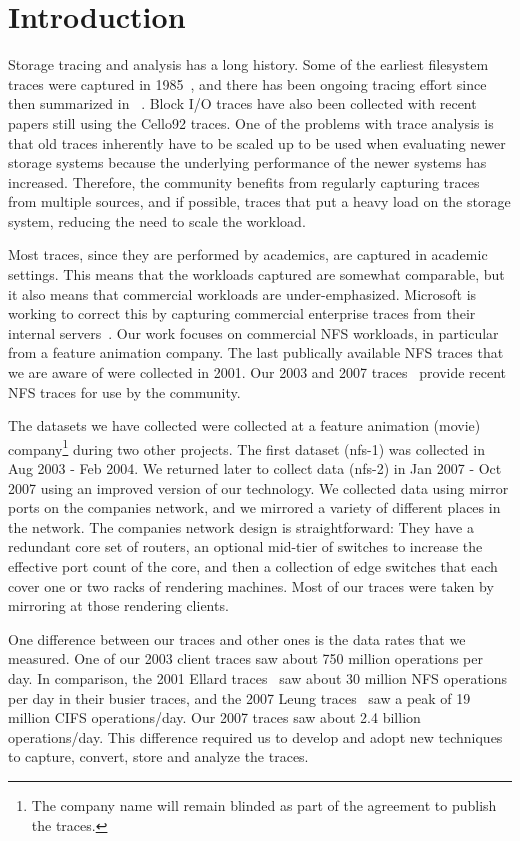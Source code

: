 \section{Introduction}

Storage tracing and analysis has a long history.  Some of the earliest
filesystem traces were captured in 1985~\cite{ousterhout85}, and there
has been ongoing tracing effort since then summarized in
~\cite{LeungUsenix08}.  Block I/O traces have also been collected with
recent papers still using the Cello92 traces.  One of the problems
with trace analysis is that old traces inherently have to be scaled up
to be used when evaluating newer storage systems because the
underlying performance of the newer systems has increased.  Therefore,
the community benefits from regularly capturing traces from multiple
sources, and if possible, traces that put a heavy load on the storage
system, reducing the need to scale the workload.

Most traces, since they are performed by academics, are captured in
academic settings.  This means that the workloads captured are
somewhat comparable, but it also means that commercial workloads are
under-emphasized.  Microsoft is working to correct this by capturing
commercial enterprise traces from their internal
servers~\cite{snia-iotta-microsoft}.  Our work focuses on commercial
NFS workloads, in particular from a feature animation company.  The
last publically available NFS traces that we are aware of were
collected in 2001.  Our 2003 and 2007
traces~\cite{animation-bear-traces} provide recent NFS traces for use
by the community.

The datasets we have collected were collected at a feature animation
(movie) company\footnote{The company name will remain blinded as part
of the agreement to publish the traces.} during two other projects.
The first dataset (nfs-1) was collected in Aug 2003 - Feb 2004.  We
returned later to collect data (nfs-2) in Jan 2007 - Oct 2007 using an
improved version of our technology.  We collected data using mirror
ports on the companies network, and we mirrored a variety of different
places in the network.  The companies network design is
straightforward: They have a redundant core set of routers, an
optional mid-tier of switches to increase the effective port count of
the core, and then a collection of edge switches that each cover one
or two racks of rendering machines.  Most of our traces were taken by
mirroring at those rendering clients.

One difference between our traces and other ones is the data rates that
we measured.  One of our 2003 client traces saw about 750 million
operations per day.  In comparison, the 2001 Ellard
traces~\cite{EllardFast03} saw about 30 million NFS operations per day
in their busier traces, and the 2007 Leung traces~\cite{LeungUsenix08}
saw a peak of 19 million CIFS operations/day.  Our 2007 traces saw
about 2.4 billion operations/day.  This difference required us to
develop and adopt new techniques to capture, convert, store and
analyze the traces.

